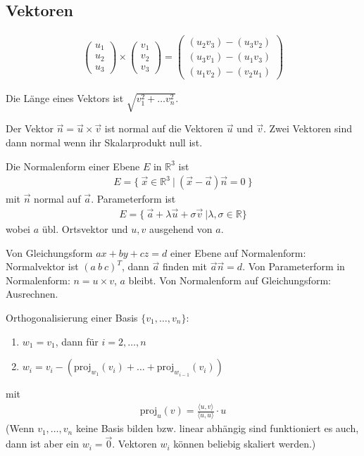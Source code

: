 \documentclass{article}
\begin{document}
\begin{multicols}{2}

\section*{Vektoren}

\begin{align*}
    \begin{pmatrix*}
        u_1 \\
        u_2 \\
        u_3
    \end{pmatrix*} \times \begin{pmatrix*}
        v_1 \\
        v_2 \\
        v_3
    \end{pmatrix*} = \begin{pmatrix*}
        (u_2v_3) - (u_3v_2) \\
        (u_3v_1) - (u_1v_3) \\
        (u_1v_2) - (v_2u_1) 
    \end{pmatrix*}
\end{align*}

Die Länge eines Vektors ist $\sqrt{v_1^2 + \ldots v_n^2}$.

Der Vektor $\vec{n} = \vec{u} \times \vec{v}$ ist normal auf die Vektoren $\vec{u}$ und $\vec{v}$. Zwei Vektoren sind dann normal wenn ihr Skalarprodukt null ist.

Die Normalenform einer Ebene $E$ in $\mathbb{R}^3$ ist
\begin{align*}
    E = \{\ \vec{x} \in \mathbb{R}^3\ |\ (\vec{x} - \vec{a})\vec{n} = 0\ \}
\end{align*}
mit $\vec{n}$ normal auf $\vec{a}$. Parameterform ist
\begin{align*}
    E = \{\ \vec{a} + \lambda\vec{u} + \sigma\vec{v}\ | \lambda, \sigma \in \mathbb{R} \}
\end{align*}
wobei $a$ übl. Ortsvektor und $u, v$ ausgehend von $a$.

Von Gleichungsform $ax + by + cz = d$ einer Ebene auf Normalenform: Normalvektor ist $(a\ b\ c)^T$, dann $\vec{a}$ finden mit $\vec{a}\vec{n} = d$. Von Parameterform in Normalenform: $n = u \times v$, $a$ bleibt. Von Normalenform auf Gleichungsform: Ausrechnen.

Orthogonalisierung einer Basis $\{v_1, \ldots, v_n\}$:
\begin{enumerate}[label={\arabic*)}]
    \item $w_1 = v_1$, dann für $i = 2, \ldots, n$ 
    \item $w_i = v_i - (\text{proj}_{w_1}(v_i) + \ldots + \text{proj}_{w_{i - 1}}(v_i))$
\end{enumerate}
mit
\begin{align*}
    \text{proj}_u(v) = \frac{\langle u, v\rangle}{\langle u, u\rangle} \cdot u
\end{align*}
(Wenn $v_1, \ldots, v_n$ keine Basis bilden bzw. linear abhängig sind funktioniert es auch, dann ist aber ein $w_i = \vec{0}$. Vektoren $w_i$ können beliebig skaliert werden.)


\end{multicols}
\end{document}
